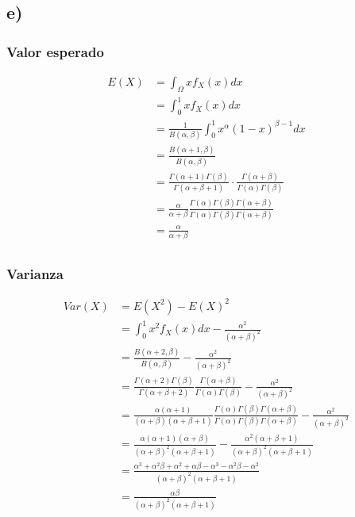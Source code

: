 \documentclass{article}
\begin{document}
\begin{tcolorbox}[breakable]
    \subsection*{e)}
    \subsubsection*{Valor esperado}
    \begin{align*}
        E(X)
        &= \int_\Omega xf_X(x)dx \\
        &= \int_{0}^1 xf_X(x)dx \\
        &= \frac{1}{B(\alpha,\beta)} \int_{0}^1 x^\alpha(1-x)^{\beta-1}dx \\
        &= \frac{B(\alpha+1,\beta)}{B(\alpha,\beta)} \\
        &= \frac{\Gamma(\alpha+1)\Gamma(\beta)}{\Gamma(\alpha+\beta+1)} \cdot \frac{\Gamma(\alpha + \beta)}{\Gamma(\alpha)\Gamma(\beta)} \\
        &= \frac{\alpha}{\alpha + \beta} \frac{\Gamma(\alpha) \Gamma(\beta) \Gamma(\alpha + \beta)}{\Gamma(\alpha) \Gamma(\beta) \Gamma(\alpha + \beta)} \\
        &= \frac{\alpha}{\alpha + \beta} \\
    \end{align*}
    \subsubsection*{Varianza}
    \begin{align*}
        Var(X)&= E(X^2)-E(X)^2 \\
        &= \int_{0}^1 x^2f_X(x)dx 
        - \frac{\alpha^2}{(\alpha+\beta)^2} \\
        &= \frac{B(\alpha+2,\beta)}{B(\alpha, \beta)} 
        - \frac{\alpha^2}{(\alpha+\beta)^2} \\
        &= \frac{\Gamma(\alpha+2)\Gamma(\beta)}{\Gamma(\alpha+\beta+2)} \frac{\Gamma(\alpha+\beta)}{\Gamma(\alpha)\Gamma(\beta)}
        - \frac{\alpha^2}{(\alpha+\beta)^2} \\
        &= \frac{\alpha(\alpha+1)}{(\alpha+\beta)(\alpha+\beta+1)} \frac{\Gamma(\alpha)\Gamma(\beta)\Gamma(\alpha+\beta)}{\Gamma(\alpha)\Gamma(\beta)\Gamma(\alpha+\beta)} 
        - \frac{\alpha^2}{(\alpha+\beta)^2} \\
        &= \frac{\alpha(\alpha+1)(\alpha+\beta)}{(\alpha+\beta)^2(\alpha+\beta+1)} - \frac{\alpha^2(\alpha+\beta+1)}{(\alpha+\beta)^2(\alpha+\beta+1)} \\
        &= \frac{\alpha^3+\alpha^2\beta+ \alpha^2+\alpha \beta-\alpha^3- \alpha^2\beta  - \alpha^2}{(\alpha+\beta)^2(\alpha+\beta+1)} \\
        &= \frac{\alpha \beta}{(\alpha+\beta)^2(\alpha+\beta+1)}
    \end{align*}

\end{tcolorbox}
\end{document}
